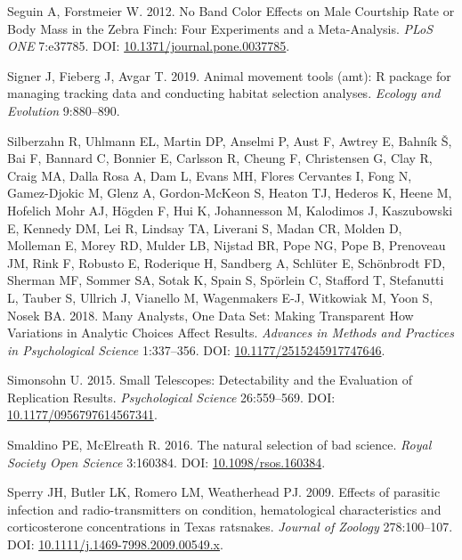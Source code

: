 \documentclass[10pt,a4paper]{article}
\newlength{\cslhangindent}
\newlength{\cslentryspacingunit} %
\newenvironment{CSLReferences}[2] %
 {%
  \setlength{\parindent}{0pt}
  \ifodd #1
  \let\oldpar\par
  \def\par{\hangindent=\cslhangindent\oldpar}
  \fi
  \setlength{\parskip}{#2\cslentryspacingunit}
 }%
 {}
\begin{document}
\begin{CSLReferences}{1}{0}
\leavevmode{}%
Seguin A, Forstmeier W. 2012. No {Band} {Color} {Effects} on {Male} {Courtship} {Rate} or {Body} {Mass} in the {Zebra} {Finch}: {Four} {Experiments} and a {Meta}-{Analysis}. \emph{PLoS ONE} 7:e37785. DOI: \href{https://doi.org/10.1371/journal.pone.0037785}{10.1371/journal.pone.0037785}.

\leavevmode{}%
Signer J, Fieberg J, Avgar T. 2019. Animal movement tools (amt): R package for managing tracking data and conducting habitat selection analyses. \emph{Ecology and Evolution} 9:880--890.

\leavevmode{}%
Silberzahn R, Uhlmann EL, Martin DP, Anselmi P, Aust F, Awtrey E, Bahník Š, Bai F, Bannard C, Bonnier E, Carlsson R, Cheung F, Christensen G, Clay R, Craig MA, Dalla Rosa A, Dam L, Evans MH, Flores Cervantes I, Fong N, Gamez-Djokic M, Glenz A, Gordon-McKeon S, Heaton TJ, Hederos K, Heene M, Hofelich Mohr AJ, Högden F, Hui K, Johannesson M, Kalodimos J, Kaszubowski E, Kennedy DM, Lei R, Lindsay TA, Liverani S, Madan CR, Molden D, Molleman E, Morey RD, Mulder LB, Nijstad BR, Pope NG, Pope B, Prenoveau JM, Rink F, Robusto E, Roderique H, Sandberg A, Schlüter E, Schönbrodt FD, Sherman MF, Sommer SA, Sotak K, Spain S, Spörlein C, Stafford T, Stefanutti L, Tauber S, Ullrich J, Vianello M, Wagenmakers E-J, Witkowiak M, Yoon S, Nosek BA. 2018. Many {Analysts}, {One} {Data} {Set}: {Making} {Transparent} {How} {Variations} in {Analytic} {Choices} {Affect} {Results}. \emph{Advances in Methods and Practices in Psychological Science} 1:337--356. DOI: \href{https://doi.org/10.1177/2515245917747646}{10.1177/2515245917747646}.

\leavevmode{}%
Simonsohn U. 2015. Small {Telescopes}: {Detectability} and the {Evaluation} of {Replication} {Results}. \emph{Psychological Science} 26:559--569. DOI: \href{https://doi.org/10.1177/0956797614567341}{10.1177/0956797614567341}.

\leavevmode{}%
Smaldino PE, McElreath R. 2016. The natural selection of bad science. \emph{Royal Society Open Science} 3:160384. DOI: \href{https://doi.org/10.1098/rsos.160384}{10.1098/rsos.160384}.

\leavevmode{}%
Sperry JH, Butler LK, Romero LM, Weatherhead PJ. 2009. Effects of parasitic infection and radio-transmitters on condition, hematological characteristics and corticosterone concentrations in {Texas} ratsnakes. \emph{Journal of Zoology} 278:100--107. DOI: \href{https://doi.org/10.1111/j.1469-7998.2009.00549.x}{10.1111/j.1469-7998.2009.00549.x}.


\end{CSLReferences}
\end{document}
